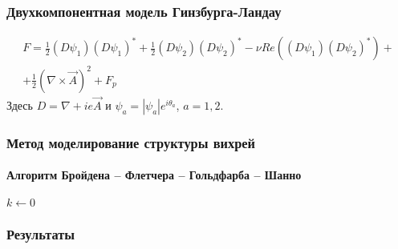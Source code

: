 \begin{frame}
    \frametitle{Двухкомпонентная модель Гинзбурга-Ландау}
    \begin{gather}
        F = \frac{1}{2}(D\psi_1)(D\psi_1)^* + 
            \frac{1}{2}(D\psi_2)(D\psi_2)^* -
            \nu Re\left( (D\psi_1)(D\psi_2)^* \right) + \nonumber \\ +
            \frac{1}{2}\left(\nabla\times\vec{A}\right)^2 + F_p
    \end{gather}
    Здесь \( D = \nabla + ie\vec{A} \) и \( \psi_a = |\psi_a|e^{i\theta_a} \), 
    \( a = 1,2 \).
\end{frame}

\begin{frame}
    \frametitle{Метод моделирование структуры вихрей}
    \framesubtitle{Алгоритм Бройдена -- Флетчера -- Гольдфарба -- Шанно}
    \begin{center}
        \begin{minipage}{2in}
            \begin{algorithm}[H]
                \scriptsize
                \SetAlgoLined
                $k \gets 0$\;
            \end{algorithm}
        \end{minipage}
    \end{center}
\end{frame}

\begin{frame}
    \frametitle{Результаты}
    \begin{figure}[h]
        \begin{minipage}[h]{0.49\linewidth}
            \center{\texttt{[image: 3d\_B]}}
        \end{minipage}
        \hfill
        \begin{minipage}[h]{0.49\linewidth}
        \end{minipage}
    \end{figure}
\end{frame}

